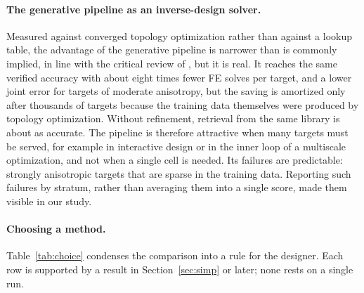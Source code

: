 \documentclass[a4paper,11pt]{article}
\begin{document}
\paragraph{The generative pipeline as an inverse-design solver.}
Measured against converged topology optimization rather than against a
lookup table, the advantage of the generative pipeline is narrower than is
commonly implied, in line with the critical review of
\citet{woldseth2022use}, but it is real. It reaches the same verified
accuracy with about eight times fewer FE solves per target, and a lower
joint error for targets of moderate anisotropy, but the saving is amortized
only after thousands of targets because the training data themselves were
produced by topology optimization. Without refinement, retrieval from the
same library is about as accurate. The pipeline is therefore attractive when
many targets must be served, for example in interactive design or in the
inner loop of a multiscale optimization, and not when a single cell is
needed. Its failures are predictable: strongly anisotropic targets that are
sparse in the training data. Reporting such failures by stratum, rather than
averaging them into a single score, made them visible in our study.

\paragraph{Choosing a method.}
Table~\ref{tab:choice} condenses the comparison into a rule for the designer.
Each row is supported by a result in Section~\ref{sec:simp} or later; none
rests on a single run.
\end{document}
